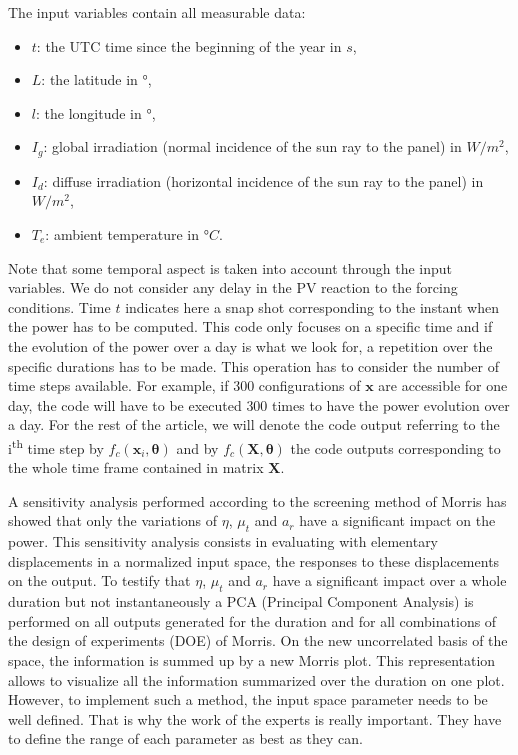 \documentclass[soumission]{jsfds}
\edef\hc{\string: }
\begin{document}
The input variables contain all measurable data\hc 
\begin{itemize}
\item $t$\hc the UTC time since the beginning of the year in $s$,
\item $L$\hc the latitude in °,
\item $l$\hc the longitude in °,
\item $I_g$\hc global irradiation (normal incidence of the sun ray to the panel) in $W/m^2$,
\item $I_d$\hc diffuse irradiation (horizontal incidence of the sun ray to the panel) in $W/m^2$,
\item $T_{e}$\hc ambient temperature in  °$C$.\newline
\end{itemize}


Note that some temporal aspect is taken into account through the input variables. We do not consider any delay in the PV reaction to the forcing conditions. Time $t$ indicates here a snap shot corresponding to the instant when the power has to be computed. This code only focuses on a specific time and if the evolution of the power over a day is what we look for, a repetition over the specific durations has to be made. This operation has to consider the number of time steps available. For example, if $300$ configurations of $\boldsymbol{x}$ are accessible for one day, the code will have to be executed $300$ times to have the power evolution over a day. For the rest of the article, we will denote the code output referring to the i\textsuperscript{th} time step by $f_c(\boldsymbol{x}_i,\boldsymbol{\theta})$ and by $f_c(\textbf{X},\boldsymbol{\theta})$ the code outputs corresponding to the whole time frame contained in matrix $\textbf{X}$. \newline

A sensitivity analysis performed according to the screening method of Morris \citep{morris1991} has showed that only the variations of $\eta$, $\mu_t$ and $a_r$ have a significant impact on the power. This sensitivity analysis consists in evaluating with elementary displacements in a normalized input space, the responses to these displacements on the output. To testify that $\eta$, $\mu_t$ and $a_r$ have a significant impact over a whole duration but not instantaneously a PCA (Principal Component Analysis) is performed on all outputs generated for the duration and for all combinations of the design of experiments (DOE) of Morris. On the new uncorrelated basis of the space, the information is summed up by a new Morris plot. This representation allows to visualize all the information summarized over the duration on one plot. However, to  implement such a method, the input space parameter needs to be well defined. That is why the work of the experts is really important. They have to define the range of each parameter as best as they can.\newline
\end{document}
